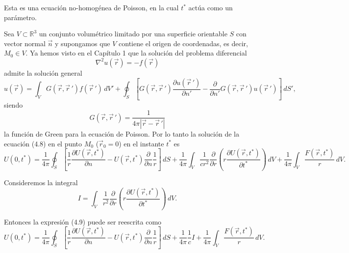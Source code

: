 \documentclass[12pt,a4paper]{book}
\begin{document}
Esta es una ecuación no-homogénea de Poisson, en la cual $t^*$ actúa como un parámetro.

Sea $V \subset \mathbb{R}^3$ un conjunto volumétrico limitado por una superficie orientable $S$ con vector normal $\vec{n}$ y supongamos que $V$ contiene el origen de coordenadas, es decir, $M_0 \in V$. Ya hemos visto en el Capítulo 1 que la solución del problema diferencial
\begin{equation}
\nabla^2 u(\vec{r}) = -f(\vec{r})
\end{equation}
admite la solución general
\begin{equation}
u(\vec{r}) = \int_V G(\vec{r},\vec{r}\,')f(\vec{r}\,')\,dV' + \oint_S \left[G(\vec{r},\vec{r}\,')\frac{\partial u(\vec{r}\,')}{\partial n'} - \frac{\partial}{\partial n'}G(\vec{r},\vec{r}\,')u(\vec{r}\,')\right]\,dS',
\end{equation}
siendo
\begin{equation}
G(\vec{r},\vec{r}\,') = \frac{1}{4\pi|\vec{r} - \vec{r}\,'|}
\end{equation}
la función de Green para la ecuación de Poisson. Por lo tanto la solución de la ecuación (4.8) en el punto $M_0$ ($\vec{r}_0 = 0$) en el instante $t^*$ es
\begin{equation}
U(0, t^*) = \frac{1}{4\pi}\oint_S \left[\frac{1}{r}\frac{\partial U(\vec{r}, t^*)}{\partial n} - U(\vec{r}, t^*)\frac{\partial}{\partial n}\frac{1}{r}\right]\,dS + \frac{1}{4\pi}\int_V \frac{1}{cr^2}\frac{\partial}{\partial r}\left(r\frac{\partial U(\vec{r}, t^*)}{\partial t^*}\right)\,dV + \frac{1}{4\pi}\int_V \frac{F(\vec{r}, t^*)}{r}\,dV.
\end{equation}

Consideremos la integral
\begin{equation}
I = \int_V \frac{1}{r^2}\frac{\partial}{\partial r}\left(r\frac{\partial U(\vec{r}, t^*)}{\partial t^*}\right)\,dV.
\end{equation}

Entonces la expresión (4.9) puede ser reescrita como
\begin{equation}
U(0, t^*) = \frac{1}{4\pi}\oint_S \left[\frac{1}{r}\frac{\partial U(\vec{r}, t^*)}{\partial n} - U(\vec{r}, t^*)\frac{\partial}{\partial n}\frac{1}{r}\right]\,dS + \frac{1}{4\pi}\frac{1}{c}I + \frac{1}{4\pi}\int_V \frac{F(\vec{r}, t^*)}{r}\,dV.
\end{equation}
\end{document}
